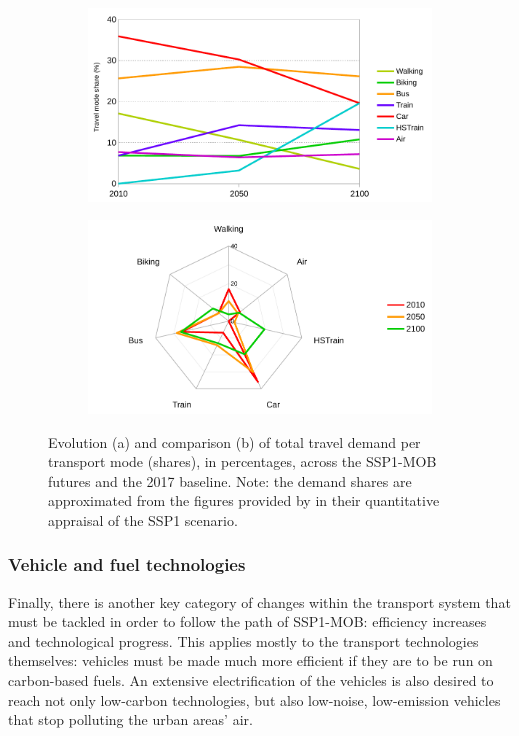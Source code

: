 \begin{figure}
		\centering
  \begin{subfigure}{0.8\textwidth}
    \includegraphics[width=\linewidth]{figures/line_travel-demand-shares.pdf}
    \caption{}
    \label{f:results:line_travel-demand-shares}
  \end{subfigure}
  \begin{subfigure}{0.8\textwidth}
    \includegraphics[width=\linewidth]{figures/radar_travel-demand-shares.pdf}
    \caption{}
    \label{f:results:radar_travel-demand-shares}
  \end{subfigure}
  \caption[Evolution and comparison of travel demand shares in SSP1-MOB.]{Evolution (a) and comparison (b) of total travel demand per transport mode (shares), in percentages, across the SSP1-MOB futures and the 2017 baseline. Note: the demand shares are approximated from the figures provided by \textcite{vuuren2017_Energylanduse} in their quantitative appraisal of the SSP1 scenario.}
  \label{f:results:travel-demand-shares}
\end{figure}

\subsubsection*{Vehicle and fuel technologies}
Finally, there is another key category of changes within the transport system that must be tackled in order to follow the path of SSP1-MOB: efficiency increases and technological progress. This applies mostly to the transport technologies themselves: vehicles must be made much more efficient if they are to be run on carbon-based fuels. An extensive electrification of the vehicles is also desired to reach not only low-carbon technologies, but also low-noise, low-emission vehicles that stop polluting the urban areas' air.

